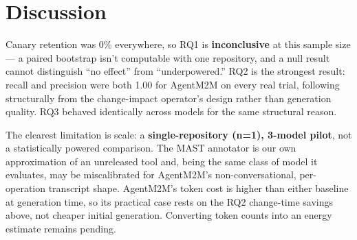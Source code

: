 \documentclass[11pt]{article}
\newcommand{\tool}{AgentM2M}
\begin{document}
\section*{Discussion}

Canary retention was 0\% everywhere, so RQ1 is \textbf{inconclusive} at
this sample size --- a paired bootstrap isn't computable with one
repository, and a null result cannot distinguish ``no effect'' from
``underpowered.'' RQ2 is the strongest result: recall and precision were
both 1.00 for \tool{} on every real trial, following structurally from
the change-impact operator's design rather than generation quality. RQ3
behaved identically across models for the same structural reason.

The clearest limitation is scale: a \textbf{single-repository (n=1),
3-model pilot}, not a statistically powered comparison. The MAST
annotator is our own approximation of an unreleased tool and, being the
same class of model it evaluates, may be miscalibrated for \tool{}'s
non-conversational, per-operation transcript shape. \tool{}'s token cost
is higher than either baseline at generation time, so its practical case
rests on the RQ2 change-time savings above, not cheaper initial
generation. Converting token counts into an energy estimate remains
pending.
\end{document}
